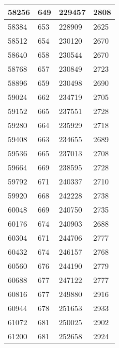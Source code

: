 \begin{longtable}{|l|l|l|l|}
		58256 & 649         & 229457          & 2808             \\ \hline
		58384 & 653         & 228909          & 2625             \\ \hline
		58512 & 654         & 230120          & 2670             \\ \hline
		58640 & 658         & 230544          & 2670             \\ \hline
		58768 & 657         & 230849          & 2723             \\ \hline
		58896 & 659         & 230498          & 2690             \\ \hline
		59024 & 662         & 234719          & 2705             \\ \hline
		59152 & 665         & 237551          & 2728             \\ \hline
		59280 & 664         & 235929          & 2718             \\ \hline
		59408 & 663         & 234655          & 2689             \\ \hline
		59536 & 665         & 237013          & 2708             \\ \hline
		59664 & 669         & 238595          & 2728             \\ \hline
		59792 & 671         & 240337          & 2710             \\ \hline
		59920 & 668         & 242228          & 2738             \\ \hline
		60048 & 669         & 240750          & 2735             \\ \hline
		60176 & 674         & 240903          & 2688             \\ \hline
		60304 & 671         & 244706          & 2777             \\ \hline
		60432 & 674         & 246157          & 2768             \\ \hline
		60560 & 676         & 244190          & 2779             \\ \hline
		60688 & 677         & 247122          & 2777             \\ \hline
		60816 & 677         & 249880          & 2916             \\ \hline
		60944 & 678         & 251653          & 2933             \\ \hline
		61072 & 681         & 250025          & 2902             \\ \hline
		61200 & 681         & 252658          & 2924             \\ \hline

\end{longtable}
